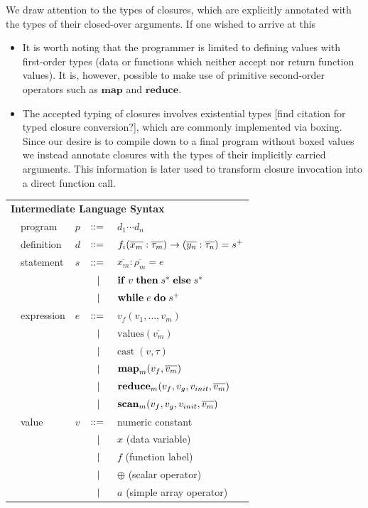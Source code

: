 \documentclass[preprint]{sigplanconf}
\begin{document}
We draw attention to the types of closures, which are explicitly annotated with the types of their closed-over arguments. If one wished to arrive at this 
\begin{itemize}
\item It is worth noting that the programmer is limited to defining values with first-order types (data or functions which neither accept nor return function values). It is, however, possible to make use of primitive second-order operators such as $\mathbf{map}$ and $\mathbf{reduce}$. 
\item The accepted typing of closures involves existential types [find citation for typed closure conversion?], which are commonly implemented via boxing. Since our desire is to compile down to a final program without boxed values we instead annotate closures with the types of their implicitly carried arguments. This information is later used to transform closure invocation into a direct function call. 

\end{itemize}
\begin{tabular}{m{0.1cm}m{1.5cm}m{0.1cm}m{0.2cm}p{4.8cm}}
 \multicolumn{5}{l}{\textbf{Intermediate Language Syntax}}  \\[4pt]
& program & $p$ &  $::=$   &  $d_1 \cdots d_n $ \\[4pt]
& definition & $d$ & $::=$ & $f_i(\overline{x_m} : \overline{\tau_m}) \rightarrow (\overline{y_n} : \overline{\tau_n}) =s^{\small{+}}$ \\[4pt]
& statement  & $s$ & $::=$ & $\overline{x_m} : \overline{\rho_m} = e $\\[2pt]
&            &     & $\ \ | \ \ $    & $\mbox{\textbf{if}} \;v\; \mbox{\textbf{then}} \;s^*\; \mbox{\textbf{else}} \;s^*$ \\[2pt]
&            &     & $\ \ | \ \ $    & $\mbox{\textbf{while}} \;e\; \mbox{\textbf{do}} \;s^+\;  $ \\[4pt]
& expression & $e$ & $::=$ & $ v_{f}(v_1, \ldots, v_m)$ \\[2pt]
&            &     & $\ \ | \ \ $    & $\textrm{values} (\overline{v_m})$ \\[2pt]
&            &     & $\ \ | \ \ $    & $\textrm{cast} \; (v, \tau)$ \\[2pt] 
&            &     & $\ \ | \ \ $    & $\mbox{\textbf{map}}_m (v_{f},\overline{v_m})$ \\[2pt]
&            &     & $\ \ | \ \ $    & $\mbox{\textbf{reduce}}_m (v_{f}, v_{g}, v_{init}, \overline{v_m})$ \\[2pt]
&            &     & $\ \ | \ \ $    & $\mbox{\textbf{scan}}_m (v_{f}, v_{g}, v_{init}, \overline{v_m})$ \\[4pt]
& value      & $v$ & $::=$ & numeric constant\\[2pt]
&            &     & $\ \ | \ \ $    &  $x$  \quad \small{(data variable)} \\[2pt]
&            &     & $\ \ | \ \ $    &  $f$  \quad \small{(function label)} \\[2pt]
&            &     & $\ \ | \ \ $    &  $\oplus$ \quad \small{(scalar operator)} \\[2pt]
&            &     & $\ \ | \ \ $    &  $a$ \quad \small{(simple array operator)} \\[4pt]
\end{tabular}
\end{document}
